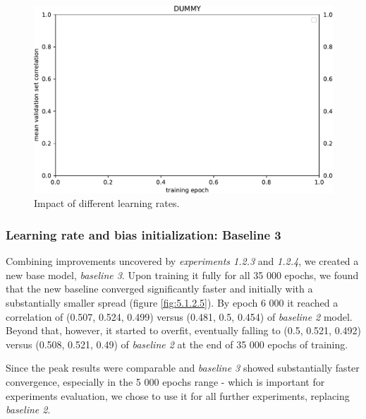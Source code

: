 \begin{figure}[H]
    \centering
    \includegraphics[width=1\textwidth]{../figures/05_dummy}
    \caption[Experiment 5.1.2.4]{Impact of different learning rates.}
    \label{fig:5.1.2.4}
\end{figure}

\subsubsection{Learning rate and bias initialization: Baseline 3}\label{ex:1.2.5}

Combining improvements uncovered by \emph{experiments 1.2.3} and \emph{1.2.4}, we created a new base model, \emph{baseline 3}. Upon training it fully for all 35 000 epochs, we found that the new baseline converged significantly faster and initially with a substantially smaller spread (figure \ref{fig:5.1.2.5}). By epoch 6 000 it reached a correlation of (0.507, 0.524, 0.499) versus (0.481, 0.5, 0.454) of \emph{baseline 2} model. Beyond that, however, it started to overfit, eventually falling to (0.5, 0.521, 0.492) versus (0.508, 0.521, 0.49) of \emph{baseline 2} at the end of 35 000 epochs of training. 

Since the peak results were comparable and \emph{baseline 3} showed substantially faster convergence, especially in the 5 000 epochs range - which is important for experiments evaluation, we chose to use it for all further experiments, replacing \emph{baseline 2}.

